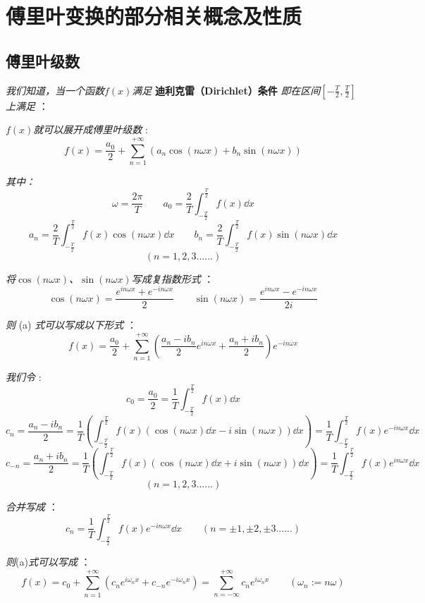 \section{傅里叶变换的部分相关概念及性质}

\subsection{傅里叶级数}

\textit{我们知道，当一个函数$f(x)$满足} \textbf{迪利克雷（Dirichlet）条件} \textit{即在区间${[-\frac{T}{2},\frac{T}{2}]}$上满足} ：

\qquad \qquad {}

\qquad \qquad {}

\textit{$f(x)$就可以展开成傅里叶级数} :
\[f(x)=\frac{a_0}{2}+\sum_{n=1}^{+\infty}(a_n\cos(n\omega x)+b_n\sin(n\omega x)) \tag{a}\]

\textit{其中：}
\[\omega=\frac{2\pi}{T} \qquad a_0=\frac{2}{T}\int_{-\frac{T}{2}}^{\frac{T}{2}}f(x)\dd{x}\]
\[a_n=\frac{2}{T}\int_{-\frac{T}{2}}^{\frac{T}{2}}f(x)\cos(n\omega x)\dd{x} \qquad b_n=\frac{2}{T}\int_{-\frac{T}{2}}^{\frac{T}{2}}f(x)\sin(n\omega x)\dd{x}\]
\[(n=1,2,3......) \tag{b}\]

\textit{将$\cos(n\omega x)$、$\sin(n\omega x)$写成复指数形式} ：
\[\cos(n\omega x)=\frac{e^{in\omega x}+e^{-in\omega x}}{2} \qquad \sin(n\omega x)=\frac{e^{in\omega x}-e^{-in\omega x}}{2i} \tag{c}\]

\textit{则} (a) \textit{式可以写成以下形式 }：
\[f(x)=\frac{a_0}{2}+\sum_{n=1}^{+\infty}(\frac{a_n-ib_n}{2}e^{in\omega x}+\frac{a_n+ib_n}{2})e^{-in\omega x} \tag{d}\]

\textit{我们令 }:
\[c_0=\frac{a_0}{2}=\frac{1}{T}\int_{-\frac{T}{2}}^{\frac{T}{2}}f(x)\dd{x}\]
\[c_n=\frac{a_n-ib_n}{2}=\frac{1}{T}(\int_{-\frac{T}{2}}^{\frac{T}{2}}f(x)(\cos(n\omega x)\dd{x}-i\sin(n\omega x))\dd{x})=\frac{1}{T}\int_{-\frac{T}{2}}^{\frac{T}{2}}f(x)e^{-in\omega x}\dd{x}\]
\[c_{-n}=\frac{a_n+ib_n}{2}=\frac{1}{T}(\int_{-\frac{T}{2}}^{\frac{T}{2}}f(x)(\cos(n\omega x)\dd{x}+i\sin(n\omega x))\dd{x})=\frac{1}{T}\int_{-\frac{T}{2}}^{\frac{T}{2}}f(x)e^{in\omega x}\dd{x}\]
\[(n=1,2,3......)\]

\textit{合并写成 }：
\[c_n=\frac{1}{T}\int_{-\frac{T}{2}}^{\frac{T}{2}}f(x)e^{-in\omega x}\dd{x} \qquad (n=\pm 1,\pm 2,\pm 3......) \tag{e}\]

\textit{则}(a)\textit{式可以写成 }：
\[f(x)=c_0+\sum_{n=1}^{+\infty}(c_ne^{i\omega_n x}+c_{-n}e^{-i\omega_n x})=\sum_{n=-\infty}^{+\infty}c_ne^{i\omega_n x} \qquad (\omega_n:=n\omega) \tag{f}\]

